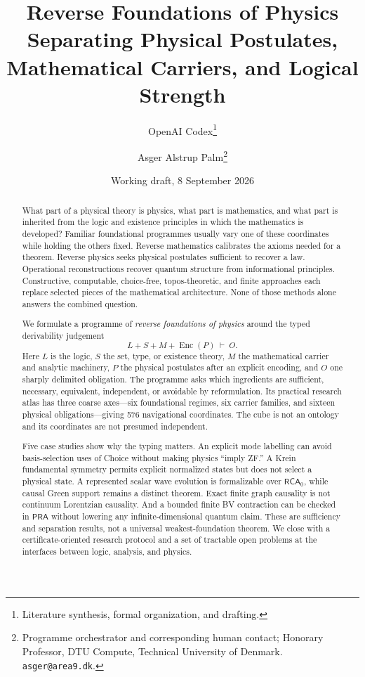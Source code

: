 \documentclass[11pt]{article}
\title{Reverse Foundations of Physics\\
\large Separating Physical Postulates, Mathematical Carriers, and Logical Strength}
\author{OpenAI Codex\thanks{Literature synthesis, formal organization, and drafting.}
\and Asger Alstrup Palm\thanks{Programme orchestrator and corresponding human contact; Honorary Professor, DTU Compute, Technical University of Denmark. \texttt{asger@area9.dk}.}}
\date{Working draft, 8 September 2026}
\theoremstyle{definition}
\theoremstyle{remark}
\newcommand{\RCA}{\mathsf{RCA}_{0}}
\newcommand{\PRA}{\mathsf{PRA}}
\newcommand{\Enc}{\operatorname{Enc}}
\begin{document}
\maketitle

\begin{abstract}
What part of a physical theory is physics, what part is mathematics, and what
part is inherited from the logic and existence principles in which the
mathematics is developed?  Familiar foundational programmes usually vary one
of these coordinates while holding the others fixed.  Reverse mathematics
calibrates the axioms needed for a theorem.  Reverse physics seeks physical
postulates sufficient to recover a law.  Operational reconstructions recover
quantum structure from informational principles.  Constructive, computable,
choice-free, topos-theoretic, and finite approaches each replace selected
pieces of the mathematical architecture.  None of those methods alone answers
the combined question.

We formulate a programme of \emph{reverse foundations of physics} around the
typed derivability judgement
\[
       L+S+M+\Enc(P)\ \vdash\ O .
\]
Here \(L\) is the logic, \(S\) the set, type, or existence theory, \(M\) the
mathematical carrier and analytic machinery, \(P\) the physical postulates
after an explicit encoding, and \(O\) one sharply delimited obligation.  The
programme asks which ingredients are sufficient, necessary, equivalent,
independent, or avoidable by reformulation.  Its practical research atlas has
three coarse axes---six foundational regimes, six carrier families, and
sixteen physical obligations---giving 576 navigational coordinates.  The cube
is not an ontology and its coordinates are not presumed independent.

Five case studies show why the typing matters.  An explicit mode labelling can
avoid basis-selection uses of Choice without making physics ``imply ZF.''  A
Krein fundamental symmetry permits explicit normalized states but does not
select a physical state.  A represented scalar wave evolution is formalizable
over \(\RCA\), while causal Green support remains a distinct theorem.  Exact
finite graph causality is not continuum Lorentzian causality.  And a bounded
finite BV contraction can be checked in \(\PRA\) without lowering any
infinite-dimensional quantum claim.  These are sufficiency and separation
results, not a universal weakest-foundation theorem.  We close with a
certificate-oriented research protocol and a set of tractable open problems
at the interfaces between logic, analysis, and physics.
\end{abstract}
\end{document}
